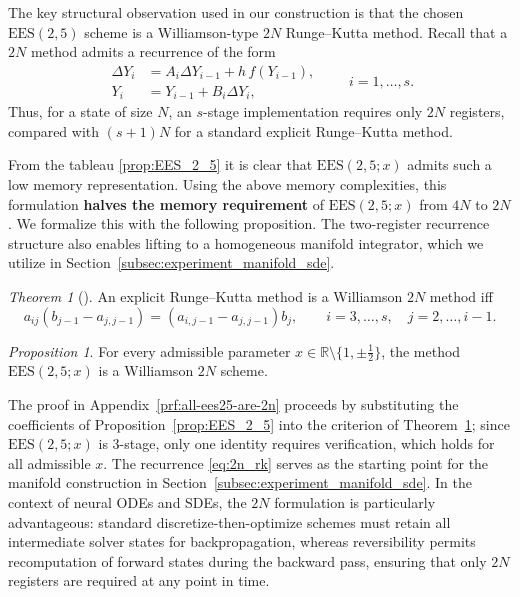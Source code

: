 \documentclass{article}
\theoremstyle{definition}
\theoremstyle{remark}
\newtheorem{proposition}{Proposition}[section]
\newtheorem{theorem}{Theorem}[section]
\begin{document}
The key structural observation used in our construction is that the chosen
$\mathrm{EES}(2,5)$ scheme is a Williamson-type $2N$ Runge--Kutta method. Recall that a $2N$ method admits a recurrence of the form
\begin{equation}
\label{eq:2n_rk}
\begin{aligned}
    \Delta Y_i &= A_i \Delta Y_{i-1} + h\, f(Y_{i-1}), \\
    Y_i &= Y_{i-1} + B_i \Delta Y_i,
\end{aligned}
\qquad i=1,\dots,s.
\end{equation}
Thus, for a state of size $N$, an $s$-stage implementation requires only $2N$
registers, compared with $(s+1)N$ for a standard explicit Runge--Kutta method.

From the tableau \ref{prop:EES_2_5} it is clear that $\mathrm{EES}(2,5;x)$ admits such a low memory representation. Using the above memory complexities, this formulation \textbf{halves the memory requirement} of $\mathrm{EES}(2,5;x)$ from $4N$ to $2N$. We formalize this with the following proposition. The two-register recurrence structure also enables lifting to a homogeneous manifold integrator, which we utilize in Section~\ref{subsec:experiment_manifold_sde}.

\begin{theorem}[{\cite[Theorem~2]{bazavov_2n-storage_2025}}]
\label{thm:2N_relationship}
An explicit Runge--Kutta method is a Williamson $2N$ method iff
\[
a_{ij}(b_{j-1}-a_{j,j-1})=(a_{i,j-1}-a_{j,j-1})b_j,
\qquad i=3,\dots,s,\quad j=2,\dots,i-1.
\]
\end{theorem}

\begin{proposition}
\label{thm:all-ees25-are-2n}
For every admissible parameter $x \in \mathbb{R}\setminus\{1,\pm \frac12\}$,
the method $\mathrm{EES}(2,5;x)$ is a Williamson $2N$ scheme.
\end{proposition}

The proof in Appendix~\ref{prf:all-ees25-are-2n} proceeds by substituting the 
coefficients of Proposition~\ref{prop:EES_2_5} into the criterion of 
Theorem~\ref{thm:2N_relationship}; since $\mathrm{EES}(2,5;x)$ is 3-stage, 
only one identity requires verification, which holds for all admissible $x$. 
The recurrence \eqref{eq:2n_rk} serves as the starting point for the manifold 
construction in Section~\ref{subsec:experiment_manifold_sde}. In the context 
of neural ODEs and SDEs, the $2N$ formulation is particularly advantageous: 
standard discretize-then-optimize schemes must retain all intermediate solver 
states for backpropagation, whereas reversibility permits recomputation of 
forward states during the backward pass, ensuring that only $2N$ registers 
are required at any point in time.
\end{document}
